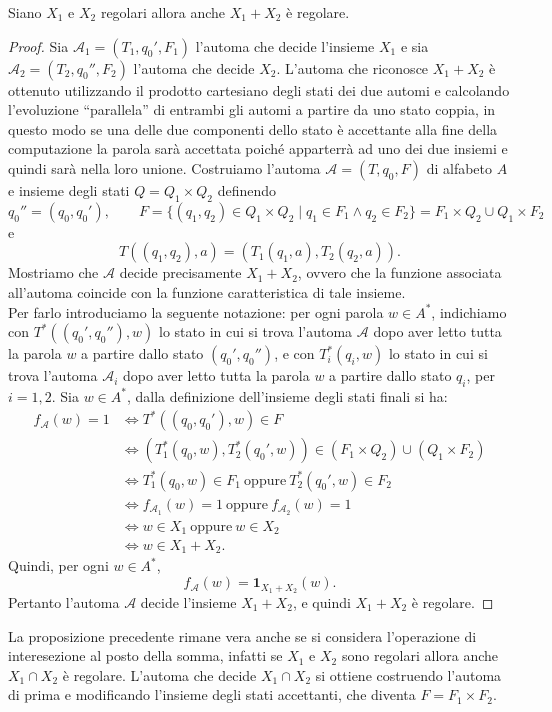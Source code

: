 \begin{prop}\label{prop:8}
Siano $X_1$ e $X_2$ regolari allora anche $X_1+X_2$ è regolare.


\begin{proof}
    
Sia $\mathcal{A}_1 = (T_1,q_0',F_1)$ l'automa che decide l'insieme $X_1$ e sia 
$\mathcal{A}_2 = (T_2,q_0'',F_2)$ l'automa che decide $X_2$.
L'automa che riconosce $X_1+X_2$
è ottenuto utilizzando il prodotto cartesiano degli stati dei due automi e 
calcolando l'evoluzione ``parallela'' di entrambi gli automi a partire da uno stato coppia, in questo modo se una delle due componenti dello stato è accettante alla fine della computazione la parola sarà accettata poiché apparterrà ad uno dei due insiemi e quindi sarà nella loro unione.
Costruiamo l'automa $\mathcal{A} = (T,q_0,F)$ di alfabeto $A$ e insieme degli 
stati $Q = Q_1\times Q_2$ definendo
\[
q_0'' = (q_0,q_0'), \qquad F =
\{ (q_1,q_2) \in Q_1\times Q_2 \mid q_1 \in F_1 \wedge q_2 \in F_2 \}
=
F_1\times Q_2 \cup Q_1\times F_2
\]
e
\[
T((q_1,q_2),a) = (T_1(q_1,a), T_2(q_2,a)).
\]
Mostriamo che $\mathcal{A}$ decide precisamente $X_1+X_2$,
ovvero che la funzione associata all'automa coincide con la funzione caratteristica
di tale insieme.
\\
Per farlo introduciamo la seguente notazione: per ogni parola $w\in A^*$, 
indichiamo con $T^*((q_0',q_0''),w)$ lo stato in cui si trova l'automa $\mathcal{A}$ 
dopo aver letto tutta la parola $w$ a partire dallo stato $(q_0',q_0'')$, 
e con $T_i^*(q_i,w)$ lo stato in cui si trova l'automa $\mathcal{A}_i$ 
dopo aver letto tutta
la parola $w$ a partire dallo stato $q_i$, per $i=1,2$.
Sia $w\in A^*$, dalla definizione dell'insieme degli stati finali si ha:
\[
\begin{aligned}
f_{\mathcal{A}}(w)=1
&\iff
T^*((q_0,q_0'),w)\in F\\
&\iff
\left(T_1^*(q_0,w),T_2^*(q_0',w)\right)
\in (F_1\times Q_2)\cup(Q_1\times F_2)\\
&\iff
T_1^*(q_0,w)\in F_1
\ \text{oppure}\
T_2^*(q_0',w)\in F_2\\
&\iff
f_{\mathcal{A}_1}(w)=1
\ \text{oppure}\
f_{\mathcal{A}_2}(w)=1\\
&\iff
w\in X_1
\ \text{oppure}\
w\in X_2\\
&\iff
w\in X_1+X_2.
\end{aligned}
\]
Quindi, per ogni $w\in A^*$,
\[
f_{\mathcal{A}}(w)=\mathbf{1}_{X_1+X_2}(w).
\]
Pertanto l'automa $\mathcal{A}$ decide l'insieme $X_1+X_2$, e quindi
$X_1+X_2$ è regolare.

\end{proof}
\end{prop}
\begin{rema}
    La proposizione precedente
    rimane vera anche se si considera l'operazione di interesezione al posto della somma,
    infatti se $X_1$ e $X_2$ sono regolari allora anche $X_1\cap X_2$ è regolare.
    L'automa che decide $X_1\cap X_2$ si ottiene costruendo l'automa di prima
    e modificando l'insieme degli stati accettanti, che diventa $F= F_1 \times F_2$.
\end{rema}


